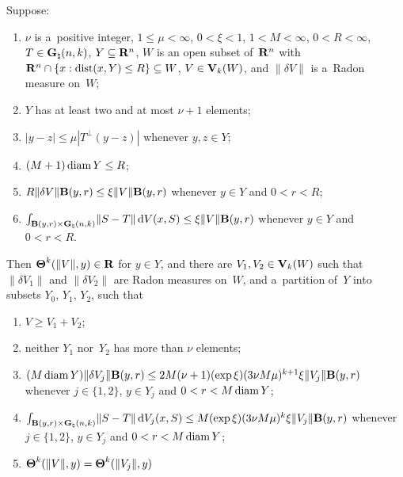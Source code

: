 \begin{lemma}
    \label{al:6.1}
    Suppose:
    \begin{enumerate}[label=(\arabic*)]
        \item \label{al:6.1(1)} $\nu$ is a~positive integer, $1 \le \mu < \infty$, $0 < \xi <
            1$, $1 < M < \infty$, $0 < R < \infty$, $T \in \mathbf{G}_{\natural}(n,k)$, $Y \subseteq
            \mathbf{R}^{n}$, $W$ is an open subset of~$\mathbf{R}^{n}$ with $\mathbf{R}^{n} \cap \{ x :
            \operatorname{dist}(x,Y) \le R \} \subseteq W$, $V \in \mathbf{V}_{k}(W)$, and $\|\delta V\|$ is
            a~Radon measure on~$W$;
        \item \label{al:6.1(2)} $Y$ has at least two and at most $\nu + 1$ elements;
        \item \label{al:6.1(3)} $|y - z| \le \mu |T^\perp(y - z)|$ whenever $y, z \in Y$;
        \item \label{al:6.1(4)} $(M + 1) \operatorname{diam} Y \le R$;
        \item \label{al:6.1(5)} $R \|\delta V\| \mathbf{B}(y,r) \le \xi \|V\| \mathbf{B}(y,r)$
            whenever $y \in Y$ and $0 < r < R$;
        \item \label{al:6.1(6)} ${\textstyle\int_{\mathbf{B}(y,r) \times \mathbf{G}_{\natural}(n,k)}^{}} \|S -
            T\| \,\mathrm{d} V(x,S) \le \xi \|V\| \mathbf{B}(y,r)$ whenever $y \in Y$ and $0 < r < R$.
    \end{enumerate}
    Then $\boldsymbol{\Theta}^{k}(\|V\|,y) \in \mathbf{R}$ for $y \in Y$, and there are $V_1, V_2 \in
    \mathbf{V}_{k}(W)$ such that $\|\delta V_1\|$ and $\|\delta V_2\|$ are Radon measures on~$W$,
    and a~partition of~$Y$ into subsets $Y_0$, $Y_1$, $Y_2$, such that
    \begin{enumerate}[label=(\arabic*),start=7]
        \item \label{al:6.1(7)} $V \ge V_1 + V_2$;
        \item \label{al:6.1(8)} neither $Y_1$ nor~$Y_2$ has more than $\nu$ elements;
        \item \label{al:6.1(9)} $(M \operatorname{diam} Y) \|\delta V_j\| \mathbf{B}(y,r) \le 2 M (\nu + 1)
            (\exp \xi) (3 \nu M \mu)^{k+1} \xi \|V_j\| \mathbf{B}(y,r)$ whenever $j \in \{1,2\}$,
            $y \in Y_j$ and $0 < r < M \operatorname{diam} Y$;
        \item \label{al:6.1(10)} ${\textstyle\int_{\mathbf{B}(y,r) \times \mathbf{G}_{\natural}(n,k)}^{}} \|S -
            T\| \,\mathrm{d} V_j(x,S) \le M (\exp \xi) (3 \nu M \mu)^{k} \xi \|V_j\| \mathbf{B}(y,r)$
            whenever $j \in \{1,2\}$, $y \in Y_j$ and $0 < r < M \operatorname{diam} Y$;
        \item \label{al:6.1(11)} $\boldsymbol{\Theta}^{k}(\|V\|,y) = \boldsymbol{\Theta}^{k}(\|V_j\|,y)$

\end{enumerate}
\end{lemma}
